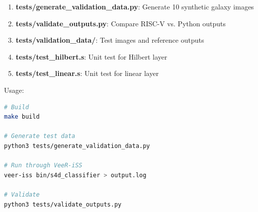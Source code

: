 \documentclass[conference]{IEEEtran}
\begin{document}
\begin{enumerate}
    \item \textbf{tests/generate\_validation\_data.py}: Generate 10 synthetic galaxy images
    \item \textbf{tests/validate\_outputs.py}: Compare RISC-V vs. Python outputs
    \item \textbf{tests/validation\_data/}: Test images and reference outputs
    \item \textbf{tests/test\_hilbert.s}: Unit test for Hilbert layer
    \item \textbf{tests/test\_linear.s}: Unit test for linear layer
\end{enumerate}

Usage:
\begin{lstlisting}[language=bash]
# Build
make build

# Generate test data
python3 tests/generate_validation_data.py

# Run through VeeR-iSS
veer-iss bin/s4d_classifier > output.log

# Validate
python3 tests/validate_outputs.py
\end{lstlisting}
\end{document}
